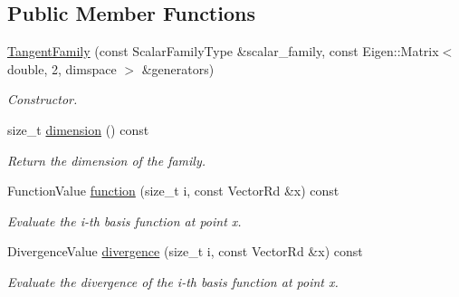 \subsection*{Public Member Functions}
\begin{DoxyCompactItemize}
\item 
\hyperlink{classHArDCore3D_1_1TangentFamily_adf75daa62a416097ab9c2ec133dd3553}{Tangent\+Family} (const Scalar\+Family\+Type \&scalar\+\_\+family, const Eigen\+::\+Matrix$<$ double, 2, dimspace $>$ \&generators)
\begin{DoxyCompactList}\small\item\em Constructor. \end{DoxyCompactList}\item 
\mbox{\label{classHArDCore3D_1_1TangentFamily_a0c8e2840a23a7f9703ca75a9504b2423}} 
size\+\_\+t \hyperlink{classHArDCore3D_1_1TangentFamily_a0c8e2840a23a7f9703ca75a9504b2423}{dimension} () const
\begin{DoxyCompactList}\small\item\em Return the dimension of the family. \end{DoxyCompactList}\item 
\mbox{\label{classHArDCore3D_1_1TangentFamily_a77132c1ffe753b76526c730aac3eec1e}} 
Function\+Value \hyperlink{classHArDCore3D_1_1TangentFamily_a77132c1ffe753b76526c730aac3eec1e}{function} (size\+\_\+t i, const Vector\+Rd \&x) const
\begin{DoxyCompactList}\small\item\em Evaluate the i-\/th basis function at point x. \end{DoxyCompactList}\item 
\mbox{\label{classHArDCore3D_1_1TangentFamily_a7b41039db007f6410867f68954b69ede}} 
Divergence\+Value \hyperlink{classHArDCore3D_1_1TangentFamily_a7b41039db007f6410867f68954b69ede}{divergence} (size\+\_\+t i, const Vector\+Rd \&x) const
\begin{DoxyCompactList}\small\item\em Evaluate the divergence of the i-\/th basis function at point x. \end{DoxyCompactList}\end{DoxyCompactItemize}

